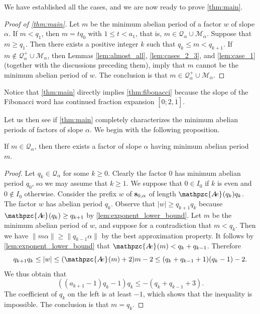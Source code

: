 \documentclass[a4paper,fleqn]{article}
\providecommand{\abs}[1]{\lvert#1\rvert}
\providecommand{\norm}[1]{\lVert#1\rVert}
\newcommand{\infw}[1]{%
  \ifcat\noexpand#1\relax\bm{#1}%
  \else\mathbf{#1}\fi}          %
\newcommand{\abexp}[2][]{\mathpzc{A\mkern-3mu e}_{#1}(#2)}
\newcommand{\qk}[1]{\mathcal{Q}_{#1}}
\newcommand{\qkl}[1]{\mathcal{Q}^+_{#1}}
\begin{document}
  We have established all the cases, and we are now ready to prove \autoref{thm:main}.

  \begin{proof}[Proof of \autoref{thm:main}]
    Let $m$ be the minimum abelian period of a factor $w$ of slope $\alpha$. If $m < q_1$, then $m = t q_0$ with
    $1 \leq t < a_1$, that is, $m \in \qk{\alpha} \cup \mathcal{M}_\alpha$. Suppose that $m \geq q_1$. Then there
    exists a positive integer $k$ such that $q_k \leq m < q_{k+1}$. If $m \notin \qkl{\alpha} \cup \mathcal{M}_\alpha$,
    then Lemmas \ref{lem:almost_all}, \ref{lem:cases_2_3}, and \ref{lem:case_1} (together with the discussions
    preceding them), imply that $m$ cannot be the minimum abelian period of $w$. The conclusion is that
    $m \in \qkl{\alpha} \cup \mathcal{M}_\alpha$.
  \end{proof}

  Notice that \autoref{thm:main} directly implies \autoref{thm:fibonacci} because the slope of the Fibonacci word has
  continued fraction expansion $[0; 2, \overline{1}]$.

  Let us then see if \autoref{thm:main} completely characterizes the minimum abelian periods of factors of slope
  $\alpha$. We begin with the following proposition.

  \begin{proposition}\label{prp:qk_admissible}
    If $m \in \qk{\alpha}$, then there exists a factor of slope $\alpha$ having minimum abelian period $m$.
  \end{proposition}
  \begin{proof}
    Let $q_k \in \qk{\alpha}$ for some $k \geq 0$. Clearly the factor $0$ has minimum abelian period $q_0$, so we may
    assume that $k \geq 1$. We suppose that $0 \in I_0$ if $k$ is even and $0 \notin I_0$ otherwise. Consider the
    prefix $w$ of $\infw{s}_{0,\alpha}$ of length $\abexp{q_k}q_k$. The factor $w$ has abelian period $q_k$. Observe
    that $\abs{w} \geq q_{k+1} q_k$ because $\abexp{q_k} \geq q_{k+1}$ by \autoref{lem:exponent_lower_bound}. Let $m$
    be the minimum abelian period of $w$, and suppose for a contradiction that $m < q_k$. Then we have
    $\norm{m\alpha} \geq \norm{q_{k-1}\alpha}$ by the best approximation property. It follows by
    \autoref{lem:exponent_lower_bound} that $\abexp{m} < q_k + q_{k-1}$. Therefore
    \begin{equation*}
      q_{k+1} q_k \leq \abs{w} \leq (\abexp{m} + 2)m - 2 \leq (q_k + q_{k-1} + 1)(q_k - 1) - 2.
    \end{equation*}
    We thus obtain that
    \begin{equation*}
      ((a_{k+1} - 1)q_k - 1)q_k \leq -(q_k + q_{k-1} + 3).
    \end{equation*}
    The coefficient of $q_k$ on the left is at least $-1$, which shows that the inequality is impossible. The
    conclusion is that $m = q_k$.
  \end{proof}
\end{document}
